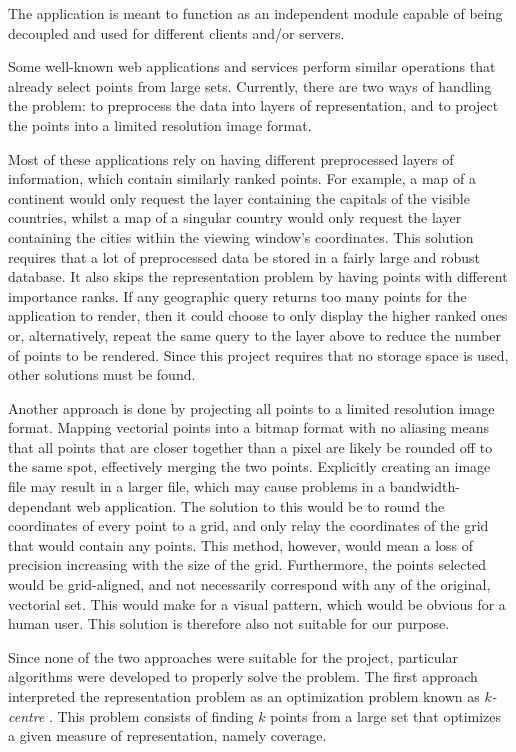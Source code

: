

The application is meant to function as an independent module capable of being decoupled and used for different clients and/or servers.

Some well-known web applications and services perform similar operations that already select points from large sets. Currently, there are two ways of handling the problem: to preprocess the data into layers of representation, and to project the points into a limited resolution image format.

Most of these applications rely on having different preprocessed layers of information, which contain similarly ranked points. For example, a map of a continent would only request the layer containing the capitals of the visible countries, whilst a map of a singular country would only request the layer containing the cities within the viewing window's coordinates. This solution requires that a lot of preprocessed data be stored in a fairly large and robust database. It also skips the representation problem by having points with different importance ranks. If any geographic query returns too many points for the application to render, then it could choose to only display the higher ranked ones or, alternatively, repeat the same query to the layer above to reduce the number of points to be rendered. Since this project requires that no storage space is used, other solutions must be found.

Another approach is done by projecting all points to a limited resolution image format. Mapping vectorial points into a bitmap format with no aliasing means that all points that are closer together than a pixel are likely be rounded off to the same spot, effectively merging the two points. Explicitly creating an image file may result in a larger file, which may cause problems in a bandwidth-dependant web application. The solution to this would be to round the coordinates of every point to a grid, and only relay the coordinates of the grid that would contain any points. This method, however, would mean a loss of precision increasing with the size of the grid. Furthermore, the points selected would be grid-aligned, and not necessarily correspond with any of the original, vectorial set. This would make for a visual pattern, which would be obvious for a human user. This solution is therefore also not suitable for our purpose.

Since none of the two approaches were suitable for the project, particular algorithms were developed to properly solve the problem. The first approach interpreted the representation problem as an optimization problem known as \emph{$k$-centre} \cite{facilityloc}. This problem consists of finding $k$ points from a large set that optimizes a given measure of representation, namely coverage.  

